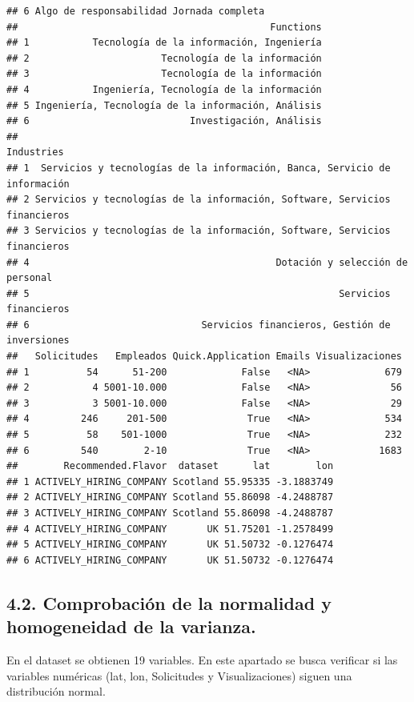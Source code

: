\documentclass[
]{article}
\begin{document}
\begin{verbatim}
## 6 Algo de responsabilidad Jornada completa
##                                            Functions
## 1           Tecnología de la información, Ingeniería
## 2                       Tecnología de la información
## 3                       Tecnología de la información
## 4           Ingeniería, Tecnología de la información
## 5 Ingeniería, Tecnología de la información, Análisis
## 6                            Investigación, Análisis
##                                                                   Industries
## 1  Servicios y tecnologías de la información, Banca, Servicio de información
## 2 Servicios y tecnologías de la información, Software, Servicios financieros
## 3 Servicios y tecnologías de la información, Software, Servicios financieros
## 4                                           Dotación y selección de personal
## 5                                                      Servicios financieros
## 6                              Servicios financieros, Gestión de inversiones
##   Solicitudes   Empleados Quick.Application Emails Visualizaciones
## 1          54      51-200             False   <NA>             679
## 2           4 5001-10.000             False   <NA>              56
## 3           3 5001-10.000             False   <NA>              29
## 4         246     201-500              True   <NA>             534
## 5          58    501-1000              True   <NA>             232
## 6         540        2-10              True   <NA>            1683
##        Recommended.Flavor  dataset      lat        lon
## 1 ACTIVELY_HIRING_COMPANY Scotland 55.95335 -3.1883749
## 2 ACTIVELY_HIRING_COMPANY Scotland 55.86098 -4.2488787
## 3 ACTIVELY_HIRING_COMPANY Scotland 55.86098 -4.2488787
## 4 ACTIVELY_HIRING_COMPANY       UK 51.75201 -1.2578499
## 5 ACTIVELY_HIRING_COMPANY       UK 51.50732 -0.1276474
## 6 ACTIVELY_HIRING_COMPANY       UK 51.50732 -0.1276474
\end{verbatim}

\hypertarget{comprobaciuxf3n-de-la-normalidad-y-homogeneidad-de-la-varianza.}{%
\subsection{4.2. Comprobación de la normalidad y homogeneidad de la
varianza.}\label{comprobaciuxf3n-de-la-normalidad-y-homogeneidad-de-la-varianza.}}

En el dataset se obtienen 19 variables. En este apartado se busca
verificar si las variables numéricas (lat, lon, Solicitudes y
Visualizaciones) siguen una distribución normal.
\end{document}
